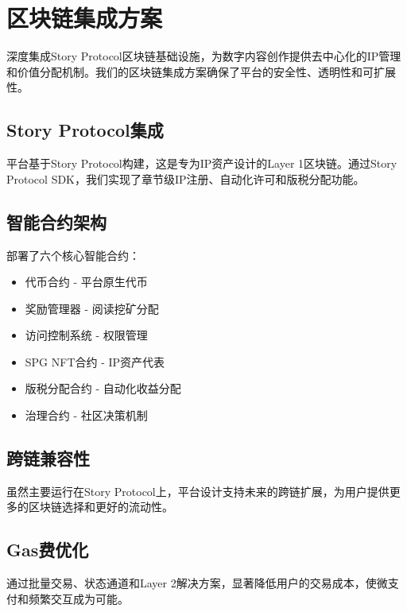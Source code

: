 \section{区块链集成方案}\label{sec:blockchain-integration-cn}

\storyhouse{}深度集成Story Protocol区块链基础设施，为数字内容创作提供去中心化的IP管理和价值分配机制。我们的区块链集成方案确保了平台的安全性、透明性和可扩展性。

\subsection{Story Protocol集成}

平台基于Story Protocol构建，这是专为IP资产设计的Layer 1区块链。通过Story Protocol SDK，我们实现了章节级IP注册、自动化许可和版税分配功能。

\subsection{智能合约架构}

部署了六个核心智能合约：
\begin{itemize}
\item \tip{}代币合约 - 平台原生代币
\item 奖励管理器 - 阅读挖矿分配
\item 访问控制系统 - 权限管理
\item SPG NFT合约 - IP资产代表
\item 版税分配合约 - 自动化收益分配
\item 治理合约 - 社区决策机制
\end{itemize}

\subsection{跨链兼容性}

虽然主要运行在Story Protocol上，平台设计支持未来的跨链扩展，为用户提供更多的区块链选择和更好的流动性。

\subsection{Gas费优化}

通过批量交易、状态通道和Layer 2解决方案，显著降低用户的交易成本，使微支付和频繁交互成为可能。